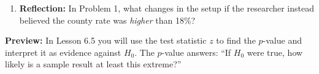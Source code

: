 \documentclass[10pt]{article}
\begin{document}
\begin{enumerate}
  \item \textbf{Reflection:} In Problem 1, what changes in the setup if the researcher
        instead believed the county rate was \emph{higher} than 18\%? 

\end{enumerate}

\begin{reflectionbox}
\textbf{Preview:} In Lesson 6.5 you will use the test statistic $z$ to find the $p$-value
and interpret it as evidence against $H_0$. The $p$-value answers: ``If $H_0$ were true,
how likely is a sample result at least this extreme?''
\end{reflectionbox}
\end{document}
